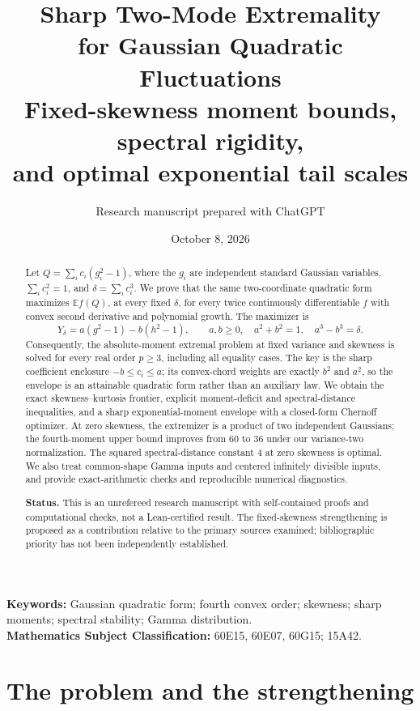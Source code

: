 \documentclass[11pt]{article}
\title{\textbf{Sharp Two-Mode Extremality\\for Gaussian Quadratic Fluctuations}\\[6pt]
\large Fixed-skewness moment bounds, spectral rigidity,\\and optimal exponential tail scales}
\author{Research manuscript prepared with ChatGPT}
\date{October 8, 2026}
\numberwithin{equation}{section}
\theoremstyle{definition}
\theoremstyle{remark}
\newcommand{\E}{\mathbb E}
\begin{document}
\maketitle
\begin{abstract}
Let $Q=\sum_i c_i(g_i^2-1)$, where the $g_i$ are independent standard Gaussian variables, $\sum_i c_i^2=1$, and $\delta=\sum_i c_i^3$. We prove that the same two-coordinate quadratic form maximizes $\E f(Q)$, at every fixed $\delta$, for every twice continuously differentiable $f$ with convex second derivative and polynomial growth. The maximizer is
\[
Y_\delta=a(g^2-1)-b(h^2-1),\qquad
 a,b\geq0,\quad a^2+b^2=1,\quad a^3-b^3=\delta.
\]
Consequently, the absolute-moment extremal problem at fixed variance and skewness is solved for every real order $p\geq3$, including all equality cases. The key is the sharp coefficient enclosure $-b\leq c_i\leq a$; its convex-chord weights are exactly $b^2$ and $a^2$, so the envelope is an attainable quadratic form rather than an auxiliary law. We obtain the exact skewness--kurtosis frontier, explicit moment-deficit and spectral-distance inequalities, and a sharp exponential-moment envelope with a closed-form Chernoff optimizer. At zero skewness, the extremizer is a product of two independent Gaussians; the fourth-moment upper bound improves from $60$ to $36$ under our variance-two normalization. The squared spectral-distance constant $4$ at zero skewness is optimal. We also treat common-shape Gamma inputs and centered infinitely divisible inputs, and provide exact-arithmetic checks and reproducible numerical diagnostics.

\smallskip
\noindent\textbf{Status.} This is an unrefereed research manuscript with self-contained proofs and computational checks, not a Lean-certified result. The fixed-skewness strengthening is proposed as a contribution relative to the primary sources examined; bibliographic priority has not been independently established.
\end{abstract}
\vspace{4pt}
\noindent\textbf{Keywords:} Gaussian quadratic form; fourth convex order; skewness; sharp moments; spectral stability; Gamma distribution.\\
\textbf{Mathematics Subject Classification:} 60E15, 60E07, 60G15; 15A42.
\newpage
\begingroup
\small
\setlength{\parskip}{0pt}
\setlength{\baselineskip}{11pt}
\tableofcontents
\endgroup
\newpage

\section{The problem and the strengthening}
\label{sec:intro}
\end{document}

